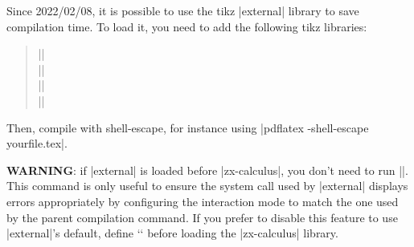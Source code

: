 \documentclass[a4paper,doc2]{ltxdoc} %
\begin{document}
{Since 2022/02/08, it is possible to use the tikz |external| library to save compilation time. To load it, you need to add the following tikz libraries:
\begin{verse}
  |\usetikzlibrary{external}|\\
  |\usetikzlibrary{zx-calculus}|\\
  |\tikzexternalize|\\
  |\zxConfigureExternalSystemCallAuto|\\
\end{verse}
Then, compile with shell-escape, for instance using |pdflatex -shell-escape yourfile.tex|.

\textbf{WARNING}: if |external| is loaded before |zx-calculus|, you don't need to run |\zxConfigureExternalSystemCallAuto|. This command is only useful to ensure the system call used by |external| displays errors appropriately by configuring the interaction mode to match the one used by the parent compilation command. If you prefer to disable this feature to use |external|'s default, define `\def\zxDoNotPatchSystemCall{}` before loading the |zx-calculus| library.

}
\end{document}
